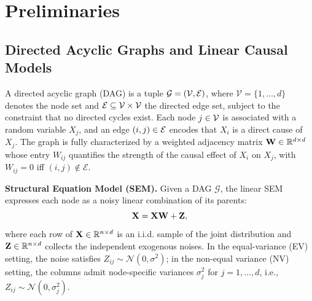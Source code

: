 \documentclass[journal,twoside]{IEEEtran}
\begin{document}
\section{Preliminaries}
\label{sec:prelim}

\subsection{Directed Acyclic Graphs and Linear Causal Models}
A directed acyclic graph (DAG) is a tuple ${\mathcal G} = ({\mathcal V},
{\mathcal E})$, where $\mathcal{V} = \{1, \ldots, d\}$ denotes the node set
and ${\mathcal E} \subseteq {\ensuremath{\mathcal V}} \times {\ensuremath{\mathcal V}}$ the directed edge
set, subject to the constraint that no directed cycles exist. Each node
$j \in {\ensuremath{\mathcal V}}$ is associated with a random variable $X_j$, and an edge
$(i, j) \in {\ensuremath{\mathcal E}}$ encodes that $X_i$ is a direct cause of $X_j$.
The graph is fully characterized by a weighted adjacency matrix
${\mathbf W} \in {\mathbb R}^{d \times d}$ whose entry $W_{ij}$ quantifies the
strength of the causal effect of $X_i$ on $X_j$, with $W_{ij} = 0$ iff
$(i,j) \notin \mathcal{E}$.

\noindent \textbf{Structural Equation Model (SEM).} Given a DAG $\mathcal{G}$, the
linear SEM expresses each node as a noisy linear combination of its
parents:
\begin{equation}
\label{eq:sem}
{\ensuremath{\mathbf X}} = {\mathbf X}{\mathbf W} + {\mathbf Z},
\end{equation}
where each row of ${\mathbf X} \in \mathbb{R}^{n \times d}$ is an i.i.d. sample
of the joint distribution and ${\mathbf Z} \in \mathbb{R}^{n \times d}$ collects
the independent exogenous noises. In the equal-variance (EV) setting,
the noise satisfies $Z_{ij} \sim \mathcal{N}(0, \sigma^2)$; in the
non-equal variance (NV) setting, the columns admit node-specific
variances $\sigma_j^2$ for $j = 1, \ldots, d$, i.e.,
$Z_{ij} \sim \mathcal{N}(0, \sigma_j^2)$.
\end{document}
